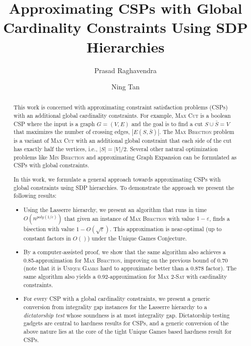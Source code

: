\documentclass[11pt]{article}
\title{Approximating CSPs with Global Cardinality Constraints Using SDP Hierarchies}
\author{Prasad Raghavendra \and Ning Tan}
\date{}
\theoremstyle{definition}
\newcommand{\problemmacro}[1]{\texorpdfstring{\textsc{#1}}{#1}\xspace}
\newcommand{\uniquegames}{\problemmacro{Unique Games}}
\newcommand{\maxcut}{\problemmacro{Max Cut}}
\newcommand{\maxtwosat}{\problemmacro{Max $2$-Sat}}
\newcommand{\minbisection}{\problemmacro{Min Bisection}}
\newcommand{\maxbisection}{\problemmacro{Max Bisection}}
\newcommand{\draftbox}{\begin{center}
  \fbox{\begin{minipage}{2in}\begin{center}\Large\textsc{Working Draft}\\Please do not distribute\end{center}\end{minipage}}\end{center}
\vspace{0.2cm}}
\newcommand{\draftbox}{}
\let\epsilon=\varepsilon
\numberwithin{equation}{section}
\begin{document}
\maketitle
\draftbox
\thispagestyle{empty}



\begin{abstract}



	This work is concerned with approximating constraint
satisfaction problems (CSPs) with an
	additional global cardinality constraints.  For example, \maxcut is a boolean CSP where the input is a
	graph $G = (V,E)$ and the goal is to find a cut $S \cup \bar S
	= V$ that maximizes the number
	of crossing edges, $|E(S,\bar S)|$.  The \maxbisection problem is a variant of \maxcut
	with an additional global constraint that each side of the cut
	has exactly half the vertices, i.e., $|S| = |V|/2$.
	Several other natural optimization problems like \minbisection and approximating Graph Expansion can be
	formulated as CSPs with global constraints.

	In this work, we formulate a general approach towards
	approximating CSPs with global constraints using SDP
	hierarchies.  To demonstrate the approach we present the
	following results:

	\begin{itemize}
	\item Using the Lasserre hierarchy, we present an algorithm
		that runs in time $O(n^{poly(1/\epsilon)})$ that given
		an instance of \maxbisection with value $1-\epsilon$,
		finds a bisection with value $1-O(\sqrt{\epsilon})$.
		This approximation is near-optimal (up to constant
		factors in $O()$) under the Unique Games Conjecture.
    \item By a computer-assisted proof, we show that the same
algorithm also achieves a 0.85-approximation for \maxbisection,
improving on the previous bound of 0.70 (note that it is \uniquegames
hard to approximate better than a 0.878 factor). The same algorithm also yields a 0.92-approximation for \maxtwosat with cardinality constraints.
	\item   For every CSP with a global cardinality constraints, we present a generic conversion from integrality gap
		instances for the Lasserre hierarchy to a {\it dictatorship
		test} whose soundness is at most integrality gap.
		Dictatorship testing gadgets are central to hardness
		results for CSPs, and a generic conversion of the
		above nature lies at the core of the tight Unique Games
		based hardness result for CSPs. \cite{Raghavendra08}

\end{itemize}
\end{abstract}
\clearpage
\end{document}
